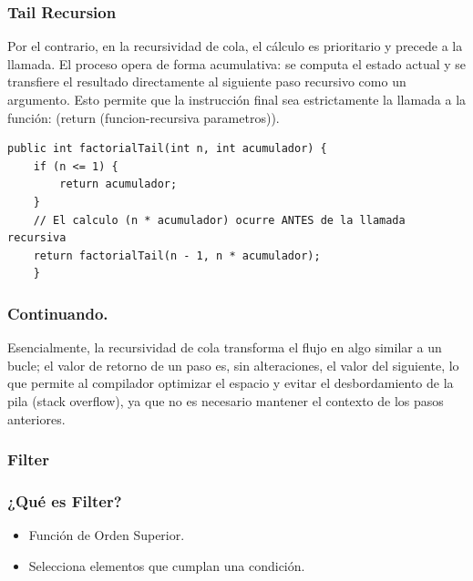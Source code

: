 \documentclass{beamer}
\begin{document}
\begin{frame}[fragile]
\frametitle{Tail Recursion}
Por el contrario, en la recursividad de cola, el cálculo es prioritario y precede a la llamada. El proceso opera de forma acumulativa: se computa el estado actual y se transfiere el resultado directamente al siguiente paso recursivo como un argumento. Esto permite que la instrucción final sea estrictamente la llamada a la función: (return (funcion-recursiva parametros)).

\begin{lstlisting}
public int factorialTail(int n, int acumulador) {
    if (n <= 1) {
        return acumulador;
    }
    // El calculo (n * acumulador) ocurre ANTES de la llamada recursiva
    return factorialTail(n - 1, n * acumulador);
    }
\end{lstlisting}
\end{frame}

\begin{frame}[fragile]
\frametitle{Continuando.}

Esencialmente, la recursividad de cola transforma el flujo en algo similar a un bucle; el valor de retorno de un paso es, sin alteraciones, el valor del siguiente, lo que permite al compilador optimizar el espacio y evitar el desbordamiento de la pila (stack overflow), ya que no es necesario mantener el contexto de los pasos anteriores.

\end{frame}


\subsubsection{Filter}
\begin{frame}[fragile]
    \frametitle{¿Qué es Filter?}
    \begin{itemize}
        \item Función de Orden Superior.
        \item Selecciona elementos que cumplan una condición.
    \end{itemize}
\end{frame}
\end{document}
